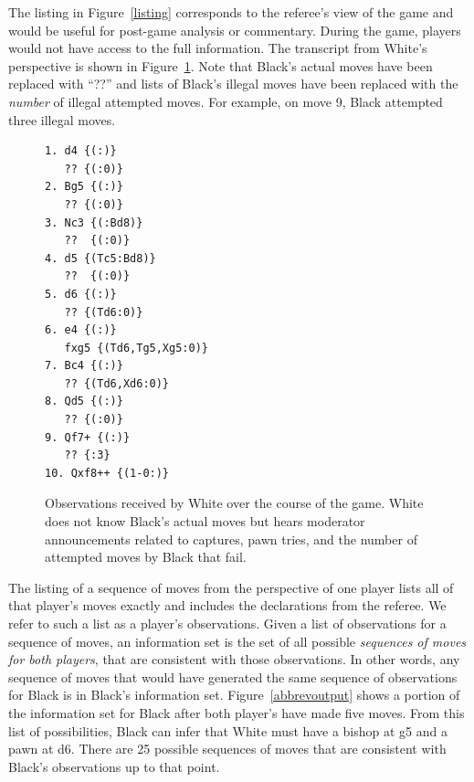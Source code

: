 \documentclass[10pt, conference, compsocconf]{IEEEtran}
\begin{document}
The listing in Figure~\ref{listing} corresponds to the referee's view of the game and would be useful for
post-game analysis or commentary.  During the game, players would not have access to the full information.  The
transcript from White's perspective is shown in Figure~\ref{filteredlisting}.  Note that Black's actual moves have been
replaced with ``??'' and lists of Black's illegal moves have been replaced with the {\em number} of illegal attempted
moves.  For example, on move 9, Black attempted three illegal moves.
\begin{figure}
\begin{verbatim}
1. d4 {(:)}
   ?? {(:0)}
2. Bg5 {(:)}
   ?? {(:0)}
3. Nc3 {(:Bd8)}
   ??  {(:0)}
4. d5 {(Tc5:Bd8)}
   ??  {(:0)}
5. d6 {(:)}
   ?? {(Td6:0)}
6. e4 {(:)}
   fxg5 {(Td6,Tg5,Xg5:0)}
7. Bc4 {(:)}
   ?? {(Td6,Xd6:0)}
8. Qd5 {(:)}
   ?? {(:0)}
9. Qf7+ {(:)} 
   ?? {:3}
10. Qxf8++ {(1-0:)}
\end{verbatim}
\caption{Observations received by White over the course of the game.  White does not know Black's actual moves but hears moderator announcements related to captures, pawn tries, and the number of attempted moves by Black that fail.}
\label{filteredlisting}
\vspace{-0.2in}
\end{figure}

The listing of a sequence of moves from the perspective of one player lists all of that player's moves exactly and
includes the declarations from the referee.  We refer to such a list as a player's observations.  Given a list of
observations for a sequence of moves, an information set is the set of all possible {\em sequences of moves for both
players}, that are consistent with those observations.  In other words, any sequence of moves that would have generated
the same sequence of observations for Black is in Black's information set.  Figure~\ref{abbrevoutput} shows a portion of the
information set for Black after both player's have made five moves.  From this list of possibilities, Black can infer
that White must have a bishop at g5 and a pawn at d6.  There are 25 possible sequences of moves that are consistent with
Black's observations up to that point. 
\end{document}
